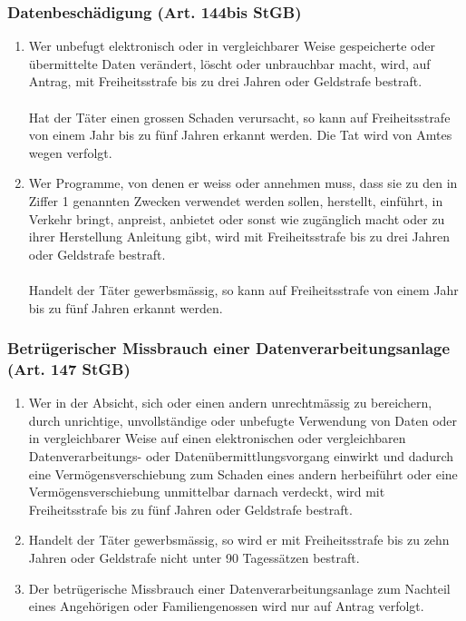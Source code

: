 \subsubsection{Datenbeschädigung (Art. 144bis StGB)}
\label{sec:CD-Datenbeschädigung}
\begin{enumerate}
	\tightlist
	\item Wer unbefugt elektronisch oder in vergleichbarer Weise gespeicherte
	oder übermittelte Daten verändert, löscht oder unbrauchbar macht, wird,
	auf Antrag, mit	Freiheitsstrafe bis zu drei Jahren oder Geldstrafe bestraft.
	\\
	\\
	Hat der Täter einen grossen Schaden verursacht, so kann auf Freiheitsstrafe
	von einem Jahr bis zu fünf Jahren erkannt werden.
	Die Tat wird von Amtes wegen verfolgt.
	\item Wer Programme, von denen er weiss oder annehmen muss, dass sie zu den
	in Ziffer 1 genannten Zwecken verwendet werden sollen, herstellt, einführt,
	in Verkehr bringt, anpreist, anbietet oder sonst wie zugänglich macht oder
	zu ihrer Herstellung Anleitung gibt, wird mit Freiheitsstrafe bis zu drei
	Jahren oder Geldstrafe bestraft.\\
	\\
	Handelt der Täter gewerbsmässig, so kann auf Freiheitsstrafe von einem Jahr bis zu
	fünf Jahren erkannt werden.
\end{enumerate}

\subsubsection{Betrügerischer Missbrauch einer Datenverarbeitungsanlage
(Art. 147 StGB)}
\label{sec:CD-Missbrauch}
\begin{enumerate}
	\tightlist
	\item Wer in der Absicht, sich oder einen andern unrechtmässig zu bereichern,
	durch unrichtige, unvollständige oder unbefugte Verwendung von Daten oder
	in vergleichbarer Weise auf einen elektronischen oder vergleichbaren
	Datenverarbeitungs- oder Datenübermittlungsvorgang einwirkt und dadurch
	eine Vermögensverschiebung zum Schaden eines andern herbeiführt oder
	eine Vermögensverschiebung unmittelbar darnach verdeckt, wird mit
	Freiheitsstrafe bis zu fünf Jahren oder Geldstrafe bestraft.
	\item Handelt der Täter gewerbsmässig, so wird er mit Freiheitsstrafe bis
	zu zehn Jahren oder Geldstrafe nicht unter 90 Tagessätzen bestraft.
	\item Der betrügerische Missbrauch einer Datenverarbeitungsanlage zum
	Nachteil eines Angehörigen oder Familiengenossen wird nur auf Antrag verfolgt.
\end{enumerate}

